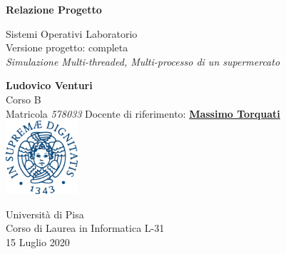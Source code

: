 \documentclass[11pt, a4paper]{article}
\begin{document}
\begin{titlepage}
    \begin{center}
        \Huge
        \textbf{Relazione Progetto}
            
        \vspace{0.5cm}
        \LARGE
        Sistemi Operativi Laboratorio\\
        \large
        \vspace{0.5cm}
        Versione progetto: completa\\
        \vspace{0.2cm}
        \textit{Simulazione Multi-threaded, Multi-processo di un supermercato}\\
        \vspace{1cm}
        \LARGE
            
        \textbf{Ludovico Venturi}\\
         \vspace{0.5cm}
         \Large
        Corso B\\
        Matricola \textit{578033}
        \small
        \tableofcontents
        \LARGE
        \vfill
        Docente di riferimento: \href{http://calvados.di.unipi.it/paragroup/torquati/}{\textbf{Massimo Torquati}}\\
        
        \vspace{1cm}            
        \includegraphics[width=0.2\textwidth]{unipi}
        \vspace{1cm}
            
        \large
		Università di Pisa\\
		Corso di Laurea in Informatica L-31 \\
        15 Luglio 2020
         \vspace{1.5cm}
            
    \end{center}
\end{titlepage}
\clearpage
\end{document}
